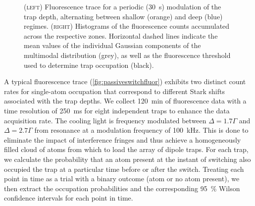 \documentclass[../Thesis-IJspeert.tex]{subfiles}
\begin{document}
\begin{figure}[!t]
	\caption[Fluorescence trace for a periodic modulation of the trap depth, alternating between shallow and deep regimes]{\textsc{(left)} Fluorescence trace for a periodic (\SI{30}{\second}) modulation of the trap depth, alternating between shallow (orange) and deep (blue) regimes. \textsc{(right)} Histograms of the fluorescence counts accumulated across the respective zones. Horizontal dashed lines indicate the mean values of the individual Gaussian components of the multimodal distribution (grey), as well as the fluorescence threshold used to determine trap occupation (black).}
	\label{fig:passiveswitchfluor} 
\end{figure}
A typical fluorescence trace (\autoref{fig:passiveswitchfluor}) exhibits two distinct count rates for single-atom occupation that correspond to different Stark shifts associated with the trap depths. We collect \SI{120}{\minute} of fluorescence data with a time resolution of \SI{250}{\ms} for eight independent traps to enhance the data acquisition rate. The cooling light is frequency modulated between $\Delta=1.7\Gamma$ and $\Delta=2.7\Gamma$ from resonance at a modulation frequency of \SI{100}{\kHz}. This is done to eliminate the impact of interference fringes and thus achieve a homogeneously filled cloud of atoms from which to load the array of dipole traps. For each trap, we calculate the probability that an atom present at the instant of switching also occupied the trap at a particular time before or after the switch. Treating each point in time as a trial with a binary outcome (atom or no atom present), we then extract the occupation probabilities and the corresponding \SI{95}{\percent} Wilson confidence intervals for each point in time.
\end{document}

